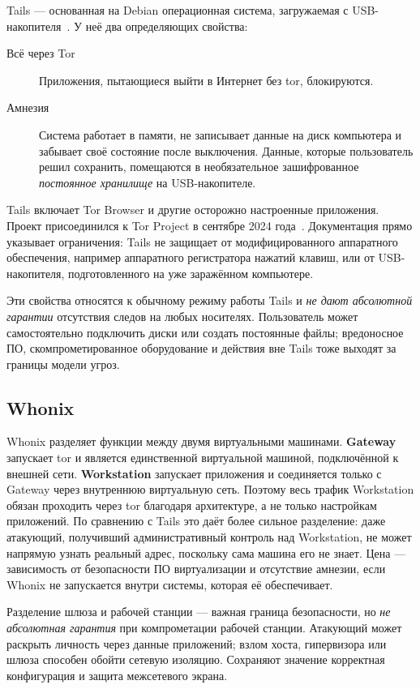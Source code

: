 Tails — основанная на Debian операционная система, загружаемая с USB-накопителя~\cite{tailsabout}. У неё два определяющих свойства:
\begin{description}
  \item[Всё через Tor] Приложения, пытающиеся выйти в Интернет без tor, блокируются.
  \item[Амнезия] Система работает в памяти, не записывает данные на диск компьютера и забывает своё состояние после выключения. Данные, которые пользователь решил сохранить, помещаются в необязательное зашифрованное \emph{постоянное хранилище} на USB-накопителе.
\end{description}
Tails включает Tor Browser и другие осторожно настроенные приложения. Проект присоединился к Tor Project в сентябре 2024 года~\cite{torblogtails}. Документация прямо указывает ограничения: Tails не защищает от модифицированного аппаратного обеспечения, например аппаратного регистратора нажатий клавиш, или от USB-накопителя, подготовленного на уже заражённом компьютере.

Эти свойства относятся к обычному режиму работы Tails и \emph{не дают абсолютной гарантии} отсутствия следов на любых носителях. Пользователь может самостоятельно подключить диски или создать постоянные файлы; вредоносное ПО, скомпрометированное оборудование и действия вне Tails тоже выходят за границы модели угроз.

\subsection{Whonix}

Whonix разделяет функции между двумя виртуальными машинами. \textbf{Gateway} запускает tor и является единственной виртуальной машиной, подключённой к внешней сети. \textbf{Workstation} запускает приложения и соединяется только с Gateway через внутреннюю виртуальную сеть. Поэтому весь трафик Workstation обязан проходить через tor благодаря архитектуре, а не только настройкам приложений. По сравнению с Tails это даёт более сильное разделение: даже атакующий, получивший административный контроль над Workstation, не может напрямую узнать реальный адрес, поскольку сама машина его не знает. Цена — зависимость от безопасности ПО виртуализации и отсутствие амнезии, если Whonix не запускается внутри системы, которая её обеспечивает.

Разделение шлюза и рабочей станции — важная граница безопасности, но \emph{не абсолютная гарантия} при компрометации рабочей станции. Атакующий может раскрыть личность через данные приложений; взлом хоста, гипервизора или шлюза способен обойти сетевую изоляцию. Сохраняют значение корректная конфигурация и защита межсетевого экрана.

